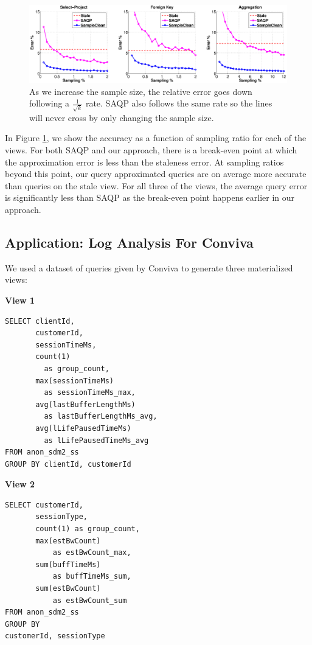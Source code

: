 \begin{figure}[ht!]
\label{exp1sample}
\hspace{-3.5em}
 \includegraphics[scale=0.21]{exp/exp1-samplesize-accuracy.eps}
 \caption{As we increase the sample size, the relative error goes down following a $\frac{1}{\sqrt{k}}$ rate. SAQP also follows the same rate so the lines will never cross by only changing the sample size.}
\end{figure}

In Figure \ref{exp1sample}, we show the accuracy as a function of sampling ratio for each of the views.
For both SAQP and our approach, there is a break-even point at which the approximation error is less than the staleness error.
At sampling ratios beyond this point, our query approximated queries are on average more accurate than queries on the stale view.
For all three of the views, the average query error is significantly less than SAQP as the break-even point happens earlier in our approach.

\subsection{Application: Log Analysis For Conviva}
We used a dataset of queries given by Conviva to generate three materialized views:
\vspace{1em}

\textbf{View 1}
\begin{lstlisting}
SELECT clientId, 
       customerId, 
       sessionTimeMs, 
       count(1) 
         as group_count, 
       max(sessionTimeMs) 
         as sessionTimeMs_max, 
       avg(lastBufferLengthMs) 
         as lastBufferLengthMs_avg,
       avg(lLifePausedTimeMs) 
         as lLifePausedTimeMs_avg 
FROM anon_sdm2_ss 
GROUP BY clientId, customerId
\end{lstlisting}

\vspace{1em}

\textbf{View 2}
\begin{lstlisting}
SELECT customerId, 
       sessionType, 
       count(1) as group_count, 
       max(estBwCount) 
           as estBwCount_max, 
       sum(buffTimeMs) 
           as buffTimeMs_sum, 
       sum(estBwCount) 
           as estBwCount_sum 
FROM anon_sdm2_ss 
GROUP BY 
customerId, sessionType
\end{lstlisting}

